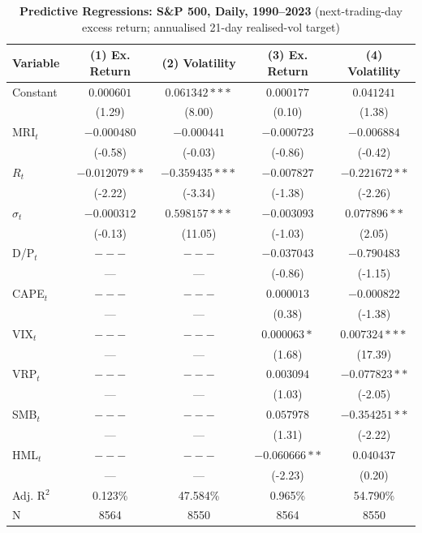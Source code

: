 \begin{table}[htbp]
\centering
\caption{\textbf{Predictive Regressions: S\&P 500, Daily, 1990--2023} (next-trading-day excess return; annualised 21-day realised-vol target)}
\label{tab:sp500d}
\begin{tabular}{lcccc}
\toprule
Variable & (1) Ex. Return & (2) Volatility & (3) Ex. Return & (4) Volatility \\
\midrule
Constant & $0.000601$ & $0.061342***$ & $0.000177$ & $0.041241$ \\
 & (1.29) & (8.00) & (0.10) & (1.38) \\
MRI$_t$ & $-0.000480$ & $-0.000441$ & $-0.000723$ & $-0.006884$ \\
 & (-0.58) & (-0.03) & (-0.86) & (-0.42) \\
$R_t$ & $-0.012079**$ & $-0.359435***$ & $-0.007827$ & $-0.221672**$ \\
 & (-2.22) & (-3.34) & (-1.38) & (-2.26) \\
$\sigma_t$ & $-0.000312$ & $0.598157***$ & $-0.003093$ & $0.077896**$ \\
 & (-0.13) & (11.05) & (-1.03) & (2.05) \\
D/P$_t$ & $---$ & $---$ & $-0.037043$ & $-0.790483$ \\
 & --- & --- & (-0.86) & (-1.15) \\
CAPE$_t$ & $---$ & $---$ & $0.000013$ & $-0.000822$ \\
 & --- & --- & (0.38) & (-1.38) \\
VIX$_t$ & $---$ & $---$ & $0.000063*$ & $0.007324***$ \\
 & --- & --- & (1.68) & (17.39) \\
VRP$_t$ & $---$ & $---$ & $0.003094$ & $-0.077823**$ \\
 & --- & --- & (1.03) & (-2.05) \\
SMB$_t$ & $---$ & $---$ & $0.057978$ & $-0.354251**$ \\
 & --- & --- & (1.31) & (-2.22) \\
HML$_t$ & $---$ & $---$ & $-0.060666**$ & $0.040437$ \\
 & --- & --- & (-2.23) & (0.20) \\
\midrule
Adj. R$^2$ & 0.123\% & 47.584\% & 0.965\% & 54.790\% \\
N & 8564 & 8550 & 8564 & 8550 \\
\bottomrule
\end{tabular}
\end{table}